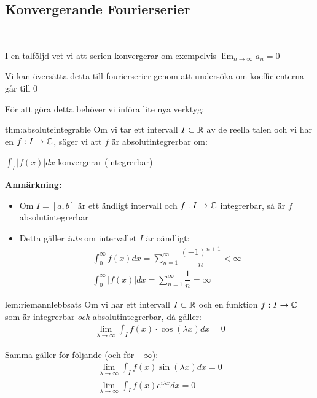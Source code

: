 \subsection{Konvergerande Fourierserier}\hfill\\\par
\noindent I en talföljd vet vi att serien konvergerar om exempelvis $\lim_{n\to\infty}a_n = 0$
\par\bigskip
\noindent Vi kan översätta detta till fourierserier genom att undersöka om koefficienterna går till 0 
\par\bigskip
\noindent För att göra detta behöver vi införa lite nya verktyg:
\par\bigskip
\begin{theo}[Absolutintegrerbar]{thm:absoluteintegrable}
  Om vi tar ett intervall $I\subset \mathbb{R}$ av de reella talen och vi har en $f:I\to\mathbb{C}$, säger vi att $f$ är absolutintegrerbar om:\par
  $\int_I |f(x)|dx$ konvergerar (integrerbar)\par
\end{theo}
\par\bigskip
\noindent\textbf{Anmärkning:}\par
\begin{itemize}
  \item Om $I = [a,b]$ är ett ändligt intervall och $f:I\to\mathbb{C}$ integrerbar, så är $f$ absolutintegrerbar\par
  \item Detta gäller \textit{inte} om intervallet $I$ är oändligt:
    \begin{equation*}
      \begin{gathered}
        \int_{0}^{\infty}f(x)dx = \sum_{n=1}^{\infty}\dfrac{(-1)^{n+1}}{n}<\infty\\
        \int_{0}^{\infty}\left|f(x)\right|dx = \sum_{n=1}^{\infty}\dfrac{1}{n} = \infty
      \end{gathered}
    \end{equation*}
\end{itemize}
\par\bigskip
\begin{lem}{lem:riemannlebbsats}
  Om vi har ett intervall $I\subset \mathbb{R}$ och en funktion $f:I\to\mathbb{C}$ som är integrerbar \textit{och} absolutintegrerbar, då gäller:
  \begin{equation*}
    \begin{gathered}
      \lim_{\lambda\to\infty}\int_{I}f(x)\cdot\cos(\lambda x)dx = 0
    \end{gathered}
  \end{equation*}
  \par\bigskip
  \noindent Samma gäller för följande (och för $-\infty$):
  \begin{equation*}
    \begin{gathered}
      \lim_{\lambda\to\infty}\int_{I}f(x)\sin(\lambda x)dx = 0\\
      \lim_{\lambda\to\infty}\int_{I}f(x)e^{i\lambda x}dx = 0
    \end{gathered}
  \end{equation*}
\end{lem}
